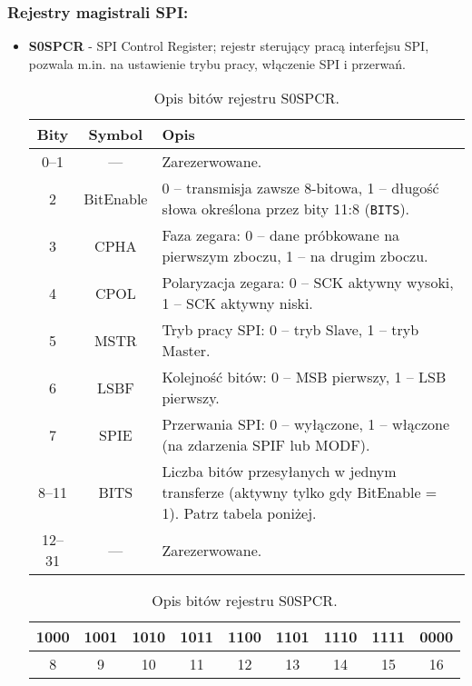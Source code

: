 \subsubsection {Rejestry magistrali SPI:}
\begin{itemize}
    \item \textbf{S0SPCR} - SPI Control Register; rejestr sterujący pracą interfejsu SPI, pozwala m.in. na ustawienie trybu pracy, włączenie SPI i przerwań.
\begin{table}[H]
\centering
\caption{Opis bitów rejestru S0SPCR.}
\vspace{0.5em}
\renewcommand{\arraystretch}{1.2}
\begin{tabular}{|c|c|p{9.5cm}|}
\hline
\textbf{Bity} & \textbf{Symbol} & \textbf{Opis} \\
\hline
0–1     & —            & Zarezerwowane. \\
\hline
2       &BitEnable  & 0 – transmisja zawsze 8-bitowa, 1 – długość słowa określona przez bity 11:8 (\texttt{BITS}). \\
\hline
3       &CPHA     & Faza zegara: 0 – dane próbkowane na pierwszym zboczu, 1 – na drugim zboczu. \\
\hline
4       & CPOL       & Polaryzacja zegara: 0 – SCK aktywny wysoki, 1 – SCK aktywny niski. \\
\hline
5       & MSTR       & Tryb pracy SPI: 0 – tryb Slave, 1 – tryb Master. \\
\hline
6       & LSBF       & Kolejność bitów: 0 – MSB pierwszy, 1 – LSB pierwszy. \\
\hline
7       & SPIE       & Przerwania SPI: 0 – wyłączone, 1 – włączone (na zdarzenia SPIF lub MODF). \\
\hline
8–11    & BITS       & Liczba bitów przesyłanych w jednym transferze (aktywny tylko gdy BitEnable = 1). Patrz tabela poniżej. \\
\hline
12–31   & —            & Zarezerwowane. \\
\hline
\end{tabular}

\vspace{1em}

\begin{tabular}{|c|c|c|c|c|c|c|c|c|}
\hline
1000 & 1001 & 1010 & 1011 & 1100 & 1101 & 1110 & 1111 & 0000\\
\hline
8    & 9    & 10   & 11   & 12   & 13   & 14   & 15 & 16\\
\hline
\end{tabular}
\end{table}


\end{itemize}
